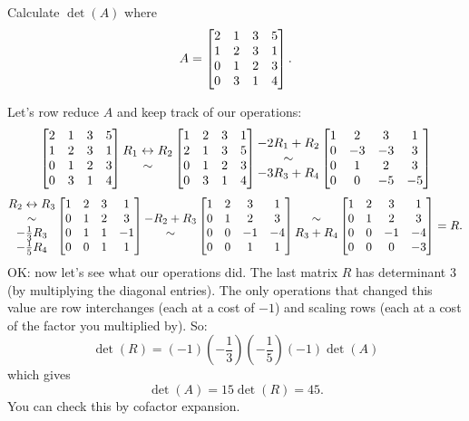 \begin{myprob}
Calculate $\det(A)$
where
$$
A = \left[ \begin{matrix} 2 & 1 & 3 & 5 \\ 1 & 2 & 3 & 1\\ 0 & 1 & 2 & 3\\ 0 & 3 & 1 & 4 \end{matrix} \right].
$$

\begin{mysol}
Let's row reduce $A$ and keep track of our operations:
$$
\left[ \begin{matrix} 
2 & 1 & 3 & 5 \\ 
1 & 2 & 3 & 1\\ 
0 & 1 & 2 & 3\\ 
0 & 3 & 1 & 4 \end{matrix} \right]
\begin{matrix} R_1 \leftrightarrow R_2 \\ \sim \end{matrix}
\left[ \begin{matrix} 
1 & 2 & 3 & 1\\ 
2 & 1 & 3 & 5 \\ 
0 & 1 & 2 & 3\\ 
0 & 3 & 1 & 4 \end{matrix} \right]
\begin{matrix}  -2R_1+R_2 \\ \sim \\ -3R_3+R_4 \end{matrix}
\left[ \begin{matrix} 
1 & 2 & 3 & 1\\ 
0 & -3 & -3 & 3 \\ 
0 & 1 & 2 & 3\\ 
0 & 0 & -5 & -5 \end{matrix} \right]
$$
$$
\begin{matrix} R_2\leftrightarrow R_3\\ \sim \\ -\frac13R_3\\ -\frac15 R_4 \end{matrix}
\left[ \begin{matrix}  
1 & 2 & 3 & 1\\ 
0 & 1 & 2 & 3\\ 
0 & 1 & 1 & -1 \\
0 & 0 & 1 & 1 \end{matrix} \right]
\begin{matrix} -R_2+R_3\\ \sim \end{matrix}
\left[ \begin{matrix}  
1 & 2 & 3 & 1\\ 
0 & 1 & 2 & 3\\ 
0 & 0 & -1 & -4 \\
0 & 0 & 1 & 1 \end{matrix} \right]
\begin{matrix} \sim \\ R_3+R_4 \end{matrix}
\left[ \begin{matrix} 
1 & 2 & 3 & 1\\ 
0 & 1 & 2 & 3\\ 
0 & 0 & -1 & -4 \\
0 & 0 & 0 & -3 \end{matrix} \right]=R.
$$
OK:  now let's see what our operations did.
The last matrix $R$ has determinant $3$ (by multiplying the
diagonal entries).  The only operations that changed
this value are row interchanges (each at a cost of $-1$) and
scaling rows (each at a cost of the factor you multiplied by). 
So:
$$
\det(R) = (-1)(-\frac13)(-\frac15)(-1)\det(A)
$$
which gives
$$
\det(A) = 15\det(R) = 45.
$$
You can check this by cofactor expansion.
\end{mysol}\end{myprob}

